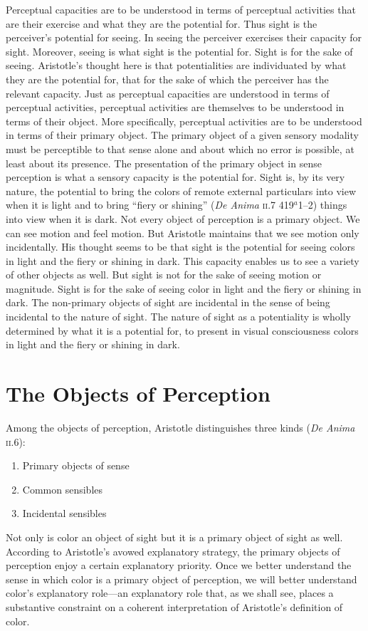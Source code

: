 Perceptual capacities are to be understood in terms of perceptual activities that are their exercise and what they are the potential for. Thus sight is the perceiver's potential for seeing. In seeing the perceiver exercises their capacity for sight. Moreover, seeing is what sight is the potential for. Sight is for the sake of seeing. Aristotle's thought here is that potentialities are individuated by what they are the potential for, that for the sake of which the perceiver has the relevant capacity. Just as perceptual capacities are understood in terms of perceptual activities, perceptual activities are themselves to be understood in terms of their object. More specifically, perceptual activities are to be understood in terms of their primary object. The primary object of a given sensory modality must be perceptible to that sense alone and about which no error is possible, at least about its presence. The presentation of the primary object in sense perception is what a sensory capacity is the potential for. Sight is, by its very nature, the potential to bring the colors of remote external particulars into view when it is light and to bring ``fiery or shining'' (\emph{De Anima} \textsc{ii}.7 419\( ^{a} \)1--2) things into view when it is dark. Not every object of perception is a primary object. We can see motion and feel motion. But Aristotle maintains that we see motion only incidentally. His thought seems to be that sight is the potential for seeing colors in light and the fiery or shining in dark. This capacity enables us to see a variety of other objects as well. But sight is not for the sake of seeing motion or magnitude. Sight is for the sake of seeing color in light and the fiery or shining in dark. The non-primary objects of sight are incidental in the sense of being incidental to the nature of sight. The nature of sight as a potentiality is wholly determined by what it is a potential for, to present in visual consciousness colors in light and the fiery or shining in dark.


\section{The Objects of Perception} %
\label{sec:the_objects_of_perception}

Among the objects of perception, Aristotle distinguishes three kinds (\emph{De Anima} \textsc{ii}.6):
\begin{enumerate}[(1)]
	\item Primary objects of sense
	\item Common sensibles
	\item Incidental sensibles
\end{enumerate}
Not only is color an object of sight but it is a primary object of sight as well. According to Aristotle's avowed explanatory strategy, the primary objects of perception enjoy a certain explanatory priority. Once we better understand the sense in which color is a primary object of perception, we will better understand color's explanatory role---an explanatory role that, as we shall see, places a substantive constraint on a coherent interpretation of Aristotle's definition of color.

